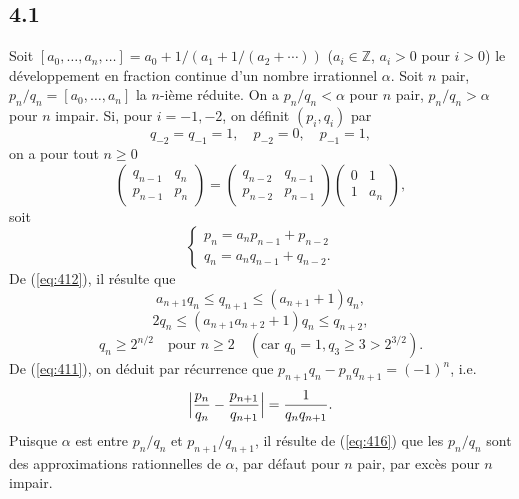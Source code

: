 \documentclass[12pt]{amsart}
\theoremstyle{plain}
\theoremstyle{remark}
\begin{document}
\subsection*{4.1}
Soit $[a_{0}, \ldots, a_{n}, \ldots] = a_{0} + 1/(a_{1} + 1/(a_{2} + \cdots))$ ($a_{i} \in \mathbb{Z}$, $a_{i} > 0$ pour $i > 0$) le d\'{e}veloppement en fraction continue d'un nombre irrationnel $\alpha$. Soit $n$ pair, $p_{n}/q_{n} = [a_{0}, \ldots, a_{n}]$ la $n$-i\`{e}me r\'{e}duite. On a $p_{n}/q_{n} < \alpha$ pour $n$ pair, $p_{n}/q_{n} > \alpha$ pour $n$ impair. Si, pour $i = -1, -2$, on d\'{e}finit $(p_{i}, q_{i})$ par
\[
q_{-2} = q_{-1} = 1, \quad p_{-2} = 0, \quad p_{-1} = 1 ,
\]
on a pour tout $n \geq 0$
\begin{equation}\label{eq:411}
\begin{pmatrix} q_{n-1} & q_{n} \\ p_{n-1} & p_{n} \end{pmatrix} = \begin{pmatrix} q_{n-2} & q_{n-1} \\ p_{n-2} & p_{n-1} \end{pmatrix} \begin{pmatrix} 0 & 1 \\ 1 & a_{n} \end{pmatrix} ,
\end{equation}
soit
\begin{equation}\label{eq:412}
\begin{cases}
p_{n} = a_{n}p_{n-1} + p_{n-2} \\ q_{n} = a_{n}q_{n-1} + q_{n-2} .
\end{cases}
\end{equation}
De (\ref{eq:412}), il r\'{e}sulte que
\begin{equation}\label{eq:413}
a_{n+1}q_{n} \leq q_{n+1} \leq (a_{n+1} + 1)q_{n} ,
\end{equation}
\begin{equation}\label{eq:414}
2q_{n} \leq (a_{n+1}a_{n+2} + 1)q_{n} \leq q_{n+2} ,
\end{equation}
\begin{equation}\label{eq:415}
q_{n} \geq 2^{n/2} \quad \text{pour } n \geq 2 \quad (\text{car } q_{0} = 1, q_{3} \geq 3 > 2^{3/2}) .
\end{equation}
De (\ref{eq:411}), on d\'{e}duit par r\'{e}currence que $p_{n+1}q_{n} - p_{n}q_{n+1} = (-1)^{n}$, i.e.
\begin{equation}\label{eq:416}
\Bigl|\frac{p_{n}}{q_{n}} - \frac{p_{n+1}}{q_{n+1}}\Bigr| = \frac{1}{q_{n}q_{n+1}} .
\end{equation}
Puisque $\alpha$ est entre $p_{n}/q_{n}$ et $p_{n+1}/q_{n+1}$, il r\'{e}sulte de (\ref{eq:416}) que les $p_{n}/q_{n}$ sont des approximations rationnelles de $\alpha$, par d\'{e}faut pour $n$ pair, par exc\`{e}s pour $n$ impair.
\end{document}
